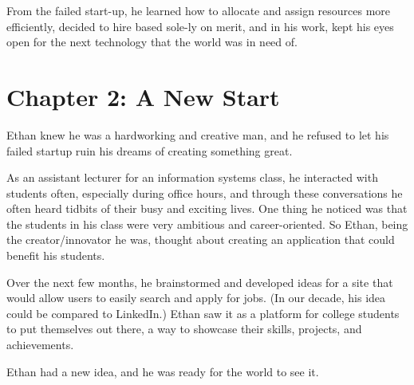 \documentclass[a4paper,12pt,twoside]{book}
\begin{document}
From the failed start-up, he learned how to allocate and assign resources more efficiently, decided to hire based sole-ly on merit, and in his work, kept his eyes open for the next technology that the world was in need of.


\chapter{Chapter 2: A New Start}
Ethan knew he was a hardworking and creative man, and he refused to let his failed startup ruin his dreams of creating something great. 

As an assistant lecturer for an information systems class, he interacted with students often, especially during office hours, and through these conversations he often heard tidbits of their busy and exciting lives. One thing he noticed was that the students in his class were very ambitious and career-oriented. So Ethan, being the creator/innovator he was, thought about creating an application that could benefit his students. 

Over the next few months, he brainstormed and developed ideas for a site that would allow users to easily search and apply for jobs. (In our decade, his idea could be compared to LinkedIn.) Ethan saw it as a platform for college students to put themselves out there, a way to showcase their skills, projects, and achievements. 

Ethan had a new idea, and he was ready for the world to see it. 
 
\end{document}
